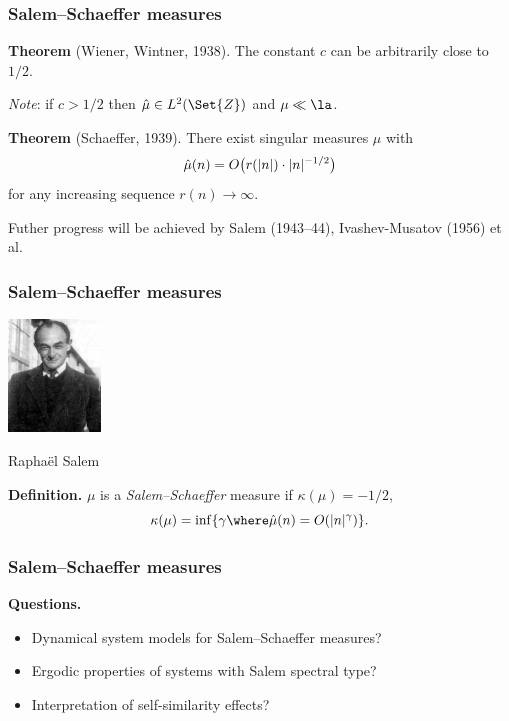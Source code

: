 \begin{frame}
  \frametitle{Salem--Schaeffer measures}
  
  {\bf Theorem} (Wiener, Wintner, 1938). The constant $c$ can be arbitrarily close to~$1/2$.   
  
  \bigskip
  {\it Note\/}: if $c > 1/2$ then $\Hat\mu \in L^2(\Set{Z})$ and $\mu \ll \la$. 
  
  \bigskip
  {\bf Theorem} (Schaeffer, 1939). There exist singular measures $\mu$ with 
  $$
    \Hat\mu(n) = O\bigl(r(|n|) \cdot |n|^{-1/2}\bigl) 
  $$
  for any increasing sequence $r(n) \to \infty$.
  
  
  \bigskip
  Futher progress will be achieved by Salem (1943--44), Ivashev-Musatov (1956) et al. 
  
\end{frame}


\begin{frame}
  \frametitle{Salem--Schaeffer measures}
  
  \begin{center}
  \includegraphics[height=30mm]{salem.jpg}
  
  Rapha\"el Salem
  \end{center}
  
  \bigskip
  {\bf Definition.} $\mu$ is a {\it Salem--Schaeffer\/} measure if $\kappa(\mu) = -1/2$, 
  $$
    \kappa(\mu) = \inf\{ \gamma \where \Hat\mu(n) = O(|n|^{\gamma}) \}. 
  $$

\end{frame}


\begin{frame}
  \frametitle{Salem--Schaeffer measures}

  {\bf Questions.} 
  
  \begin{itemize}
   \item Dynamical system models for Salem--Schaeffer measures? \\[9pt]
   \item Ergodic properties of systems with Salem spectral type? \\[9pt]
   \item Interpretation of self-similarity effects?
  \end{itemize}

  
\end{frame}



